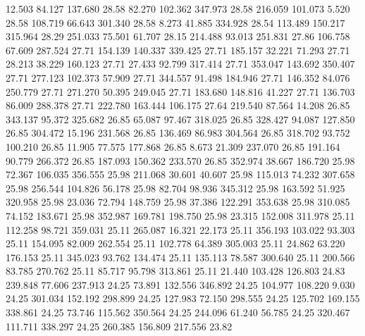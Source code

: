   12.503   84.127  137.680        28.58
  82.270  102.362  347.973        28.58
 216.059  101.073    5.520        28.58
 108.719   66.643  301.340        28.58
   8.273   41.885  334.928        28.54
 113.489  150.217  315.964        28.29
 251.033   75.501   61.707        28.15
 214.488   93.013  251.831        27.86
 106.758   67.609  287.524        27.71
 154.139  140.337  339.425        27.71
 185.157   32.221   71.293        27.71
  28.213   38.229  160.123        27.71
  27.433   92.799  317.414        27.71
 353.047  143.692  350.407        27.71
 277.123  102.373   57.909        27.71
 344.557   91.498  184.946        27.71
 146.352   84.076  250.779        27.71
 271.270   50.395  249.045        27.71
 183.680  148.816   41.227        27.71
 136.703   86.009  288.378        27.71
 222.780  163.444  106.175        27.64
 219.540   87.564   14.208        26.85
 343.137   95.372  325.682        26.85
  65.087   97.467  318.025        26.85
 328.427   94.087  127.850        26.85
 304.472   15.196  231.568        26.85
 136.469   86.983  304.564        26.85
 318.702   93.752  100.210        26.85
  11.905   77.575  177.868        26.85
   8.673   21.309  237.070        26.85
 191.164   90.779  266.372        26.85
 187.093  150.362  233.570        26.85
 352.974   38.667  186.720        25.98
  72.367  106.035  356.555        25.98
 211.068   30.601   40.607        25.98
 115.013   74.232  307.658        25.98
 256.544  104.826   56.178        25.98
  82.704   98.936  345.312        25.98
 163.592   51.925  320.958        25.98
  23.036   72.794  148.759        25.98
  37.386  122.291  353.638        25.98
 310.085   74.152  183.671        25.98
 352.987  169.781  198.750        25.98
  23.315  152.008  311.978        25.11
 112.258   98.721  359.031        25.11
 265.087   16.321   22.173        25.11
 356.193  103.022   93.303        25.11
 154.095   82.009  262.554        25.11
 102.778   64.389  305.003        25.11
  24.862   63.220  176.153        25.11
 345.023   93.762  134.474        25.11
 135.113   78.587  300.640        25.11
 200.566   83.785  270.762        25.11
  85.717   95.798  313.861        25.11
  21.440  103.428  126.803        24.83
 239.848   77.606  237.913        24.25
  73.891  132.556  346.892        24.25
 104.977  108.220    9.030        24.25
 301.034  152.192  298.899        24.25
 127.983   72.150  298.555        24.25
 125.702  169.155  338.861        24.25
  73.746  115.562  350.564        24.25
 244.096   61.240   56.785        24.25
 320.467  111.711  338.297        24.25
 260.385  156.809  217.556        23.82
